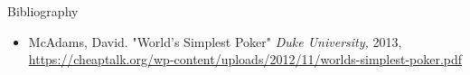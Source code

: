 \documentclass[aspectratio=169]{beamer}
\begin{document}
\begin{frame}[allowframebreaks]{Bibliography}
    \tiny
    
    
\begin{itemize}
    \item McAdams, David. "World's Simplest Poker" \textit{Duke University,} 2013, \href{https://cheaptalk.org/wp-content/uploads/2012/11/worlds-simplest-poker.pdf}{https://cheaptalk.org/wp-content/uploads/2012/11/worlds-simplest-poker.pdf}
\end{itemize}
\end{frame}
\end{document}
